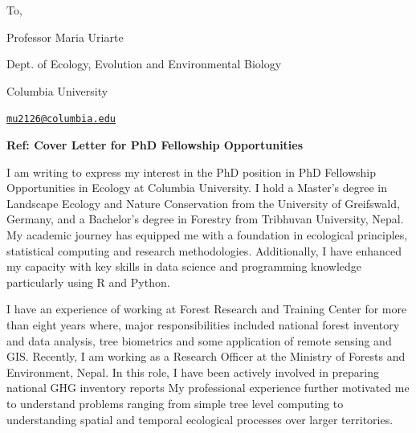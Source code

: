\documentclass[
]{article}
\author{}
\date{\vspace{-2.5em}}
\begin{document}

To,

Professor Maria Uriarte

Dept. of Ecology, Evolution and Environmental Biology

Columbia University

\href{mailto:mu2126@columbia.edu}{\nolinkurl{mu2126@columbia.edu}}

\begin{centering}

\bf{Ref: Cover Letter for PhD Fellowship Opportunities}

\end{centering}

I am writing to express my interest in the PhD position in PhD
Fellowship Opportunities in Ecology at Columbia University. I hold a
Master's degree in Landscape Ecology and Nature Conservation from the
University of Greifswald, Germany, and a Bachelor's degree in Forestry
from Tribhuvan University, Nepal. My academic journey has equipped me
with a foundation in ecological principles, statistical computing and
research methodologies. Additionally, I have enhanced my capacity with
key skills in data science and programming knowledge particularly using
R and Python.

I have an experience of working at Forest Research and Training Center
for more than eight years where, major responsibilities included
national forest inventory and data analysis, tree biometrics and some
application of remote sensing and GIS. Recently, I am working as a
Research Officer at the Ministry of Forests and Environment, Nepal. In
this role, I have been actively involved in preparing national GHG
inventory reports My professional experience further motivated me to
understand problems ranging from simple tree level computing to
understanding spatial and temporal ecological processes over larger
territories.
\end{document}
